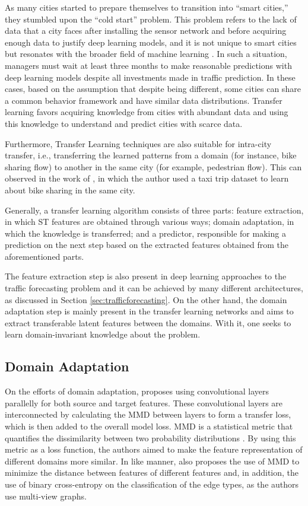 As many cities started to prepare themselves to transition into ``smart cities,'' they stumbled upon the ``cold start'' problem. This problem refers to the lack of data that a city faces after installing the sensor network and before acquiring enough data to justify deep learning models, and it is not unique to smart cities but resonates with the broader field of machine learning \cite{Ali2020}. In such a situation, managers must wait at least three months to make reasonable predictions with deep learning models despite all investments made in traffic prediction. In these cases, based on the assumption that despite being different, some cities can share a common behavior framework and have similar data distributions. Transfer learning favors acquiring knowledge from cities with abundant data and using this knowledge to understand and predict cities with scarce data.

Furthermore, Transfer Learning techniques are also suitable for intra-city transfer, i.e., transferring the learned patterns from a domain (for instance, bike sharing flow) to another in the same city (for example, pedestrian flow). This can observed in the work of \cite{Wang20224695}, in which the author used a taxi trip dataset to learn about bike sharing in the same city.

Generally, a transfer learning algorithm consists of three parts: feature extraction, in which \gls{ST} features are obtained through various ways; domain adaptation, in which the knowledge is transferred; and a predictor, responsible for making a prediction on the next step based on the extracted features obtained from the aforementioned parts.

The feature extraction step is also present in deep learning approaches to the traffic forecasting problem and it can be achieved by many different architectures, as discussed in Section \ref{sec:trafficforecasting}. On the other hand, the domain adaptation step is mainly present in the transfer learning networks and aims to extract transferable latent features between the domains. With it, one seeks to learn domain-invariant knowledge about the problem.

\subsection{Domain Adaptation}

On the efforts of domain adaptation, \cite{Wang20224695} proposes using convolutional layers parallelly for both source and target features. These convolutional layers are interconnected by calculating the \gls{MMD} between layers to form a transfer loss, which is then added to the overall model loss. \gls{MMD} is a statistical metric that quantifies the dissimilarity between two probability distributions  \cite{10.5555/2188385.2188410}. By using this metric as a loss function, the authors aimed to make the feature representation of different domains more similar. In like manner, \cite{Jin2022731} also proposes the use of \gls{MMD} to minimize the distance between features of different features and, in addition, the use of binary cross-entropy on the classification of the edge types, as the authors use multi-view graphs.

